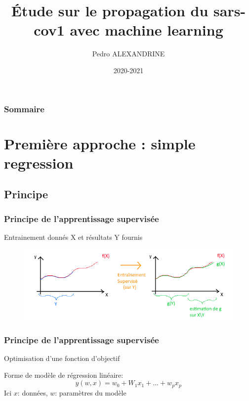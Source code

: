 \documentclass{beamer}
\title{Étude sur le propagation du sars-cov1 avec machine learning}
\date{2020-2021}
\institute{numero d'inscription : 41758}
\author{Pedro ALEXANDRINE}
\begin{document}
\begin{frame}
	\maketitle
\end{frame}

\begin{frame}
	\frametitle{Sommaire}
	\tableofcontents
\end{frame}

\section{Première approche : simple regression}
\subsection{Principe}
\begin{frame}
	\frametitle{Principe de l'apprentissage supervisée}%
	Entrainement donnés X et résultats Y fournis
	\begin{figure}[b]
		\centering
		\includegraphics[scale=0.65]{super_schema}
	\end{figure}
\end{frame}

\begin{frame}
	\frametitle{Principe de l'apprentissage supervisée}
	Optimisation d'une fonction d'objectif
	
	Forme de modèle de régression linéaire:
	\[y(w,x)=w_0+W_1x_1+...+w_px_p\]
	Ici $x$: données, $w$: paramètres du modèle
\end{frame}
\end{document}
